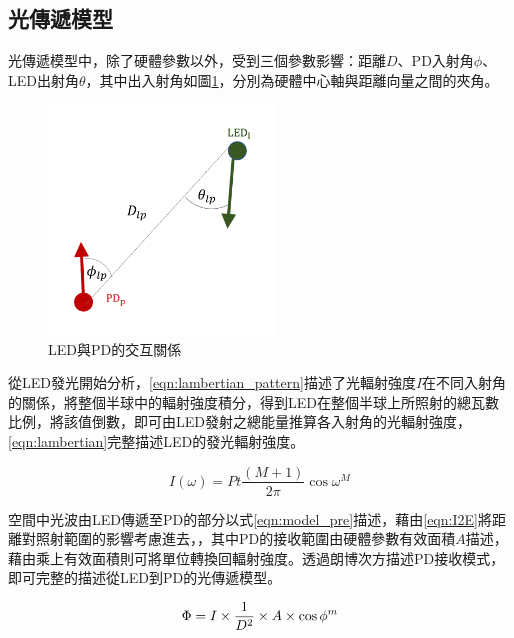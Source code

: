         

    \subsection{光傳遞模型}

    光傳遞模型中，除了硬體參數以外，受到三個參數影響：距離$D$、PD入射角$\phi$、LED出射角$\theta$，其中出入射角如圖\ref{pic:interactive}，分別為硬體中心軸與距離向量之間的夾角。

    \begin{figure}[ht]
        \centering
        \includegraphics[width=6cm]{00temppic/7.png}
        \caption{LED與PD的交互關係}
        \label{pic:interactive}
    \end{figure}

    從LED發光開始分析，\ref{eqn:lambertian_pattern}描述了光輻射強度$I$在不同入射角的關係，將整個半球中的輻射強度積分，得到LED在整個半球上所照射的總瓦數比例，將該值倒數，即可由LED發射之總能量推算各入射角的光輻射強度，\ref{eqn:lambertian}完整描述LED的發光輻射強度。
    
    \begin{equation}
        \label{eqn:lambertian}
        I(\omega)=Pt\frac{(M+1)}{2 \pi} \cos \omega^{M}
    \end{equation}
    
    空間中光波由LED傳遞至PD的部分以式\ref{eqn:model_pre}描述，藉由\ref{eqn:I2E}將距離對照射範圍的影響考慮進去，，其中PD的接收範圍由硬體參數有效面積$A$描述，藉由乘上有效面積則可將單位轉換回輻射強度。透過朗博次方描述PD接收模式，即可完整的描述從LED到PD的光傳遞模型。
    
    \begin{equation}
        \label{eqn:model_pre}
        \Phi=I\times\frac{ 1 }{D^2}\times A\times\cos\phi^{m} \\
    \end{equation}
    


